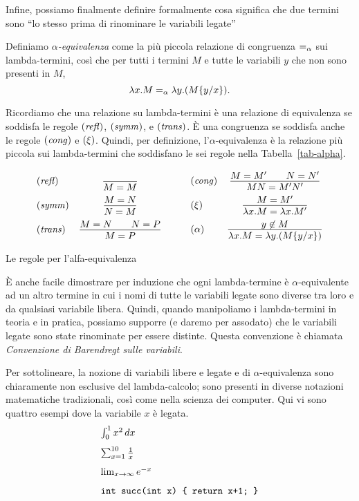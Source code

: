 \documentclass{article}
\begin{document}
Infine, possiamo finalmente definire formalmente cosa significa che due
termini sono ``lo stesso prima di rinominare le variabili legate''

\begin{definition}
  Definiamo {\em $\alpha$-equivalenza} come la pi\`u piccola relazione di congruenza 
  $=_{\alpha}$ sui lambda-termini, cos\`i che per tutti i termini $M$ e tutte le 
  variabili $y$ che non sono presenti in $M$,
  \[ \lambda x.M =_{\alpha} \lambda y.(M\{y/x\}). \]
\end{definition}


Ricordiamo che una relazione su lambda-termini \`e una relazione di equivalenza se
soddisfa le regole $\textrm{(\textit{refl\/})}$, $\textrm{(\textit{symm\/})}$, e
$\textrm{(\textit{trans\/})}$. \`E una congruenza se soddisfa anche le regole
$\textrm{(\textit{cong\/})}$ e $\textrm{(\textit{$\xi$\/})}$.  Quindi, per definizione,
l'$\alpha$-equivalenza \`e la relazione pi\`u piccola sui lambda-termini 
che soddisfano le sei regole nella Tabella~\ref{tab-alpha}.
\begin{table*}[tbp]
\[ \begin{array}{lc}
  \trule{refl} &
  \deriv{}{M=M} \nl
  \trule{symm} &
  \deriv{M=N}{N=M} \nl
  \trule{trans} &
  \deriv{M=N\sep N=P}{M=P}
\end{array} \sep
\begin{array}{lc}
  \trule{cong} &
  \deriv{M=M'\sep N=N'}{MN=M'N'} \nl
  \nrule{\xi} &
  \deriv{M=M'}{\lam x.M=\lam x.M'} \nl
  \nrule{\alpha} &
  \deriv{\mbox{$y\not\in M$}}{\lam x.M = \lam y.(\ren{M}{y}{x})}
\end{array}
\]
\caption{Le regole per l'alfa-equivalenza}
\label{tab-alpha}
\end{table*}

\`E anche facile dimostrare per induzione che ogni lambda-termine \`e
$\alpha$-equivalente ad un altro termine in cui i nomi di tutte le
variabili legate sono diverse tra loro e da qualsiasi variabile libera.
Quindi, quando manipoliamo i lambda-termini in teoria e in pratica,
possiamo supporre (e daremo per assodato) {\wloss} che le variabili legate
sono state rinominate per essere distinte. Questa convenzione \`e chiamata 
{\em Convenzione di Barendregt sulle variabili}.

Per sottolineare, la nozione di variabili libere e legate e di
$\alpha$-equivalenza sono chiaramente non esclusive del lambda-calcolo;
sono presenti in diverse notazioni matematiche tradizionali, cos\`i come
nella scienza dei computer. Qui vi sono quattro esempi dove la variabile $x$
\`e legata.
\[ \begin{array}{l}
  \int_0^1 x^2\,dx \nl
  \sum_{x=1}^{10}\frac{1}{x} \nl
  \lim_{x\to\infty} e^{-x} \nl
  \verb!int succ(int x) { return x+1; }!
\end{array}
\]
\end{document}
